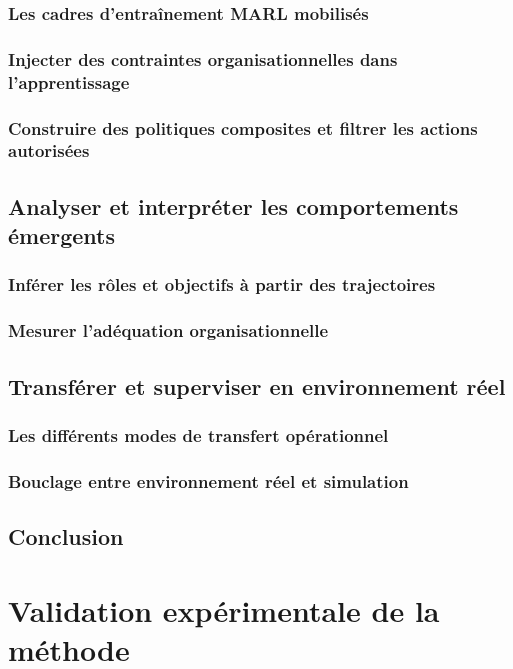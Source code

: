 \documentclass[ twoside,openright,titlepage,numbers=noenddot,headinclude,%
                footinclude=true,cleardoublepage=empty,abstractoff, %
                BCOR=5mm,paper=a4,fontsize=11pt,%
                french,american,%
                ]{scrreprt}
\begin{document}
\section{Les cadres d’entraînement MARL mobilisés}
\section{Injecter des contraintes organisationnelles dans l’apprentissage}
\section{Construire des politiques composites et filtrer les actions autorisées}

\chapter{Analyser et interpréter les comportements émergents}
\section{Inférer les rôles et objectifs à partir des trajectoires}
\section{Mesurer l'adéquation organisationnelle}

\chapter{Transférer et superviser en environnement réel}
\section{Les différents modes de transfert opérationnel}
\section{Bouclage entre environnement réel et simulation}

\chapter*{Conclusion}


\part{Validation expérimentale de la méthode}
\end{document}
